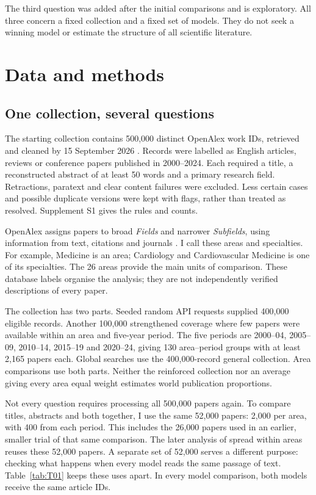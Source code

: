 \documentclass[12pt]{article}
\begin{document}
The third question was added after the initial comparisons and is exploratory. All three concern a fixed collection and a fixed set of models. They do not seek a winning model or estimate the structure of all scientific literature.

\clearpage
\section{Data and methods}
\subsection{One collection, several questions}
The starting collection contains 500,000 distinct OpenAlex work IDs, retrieved and cleaned by 15 September 2026 \citep{priem2022openalex}. Records were labelled as English articles, reviews or conference papers published in 2000--2024. Each required a title, a reconstructed abstract of at least 50 words and a primary research field. Retractions, paratext and clear content failures were excluded. Less certain cases and possible duplicate versions were kept with flags, rather than treated as resolved. Supplement S1 gives the rules and counts.

OpenAlex assigns papers to broad \emph{Fields} and narrower \emph{Subfields}, using information from text, citations and journals \citep{openalex2026topics}. I call these areas and specialties. For example, Medicine is an area; Cardiology and Cardiovascular Medicine is one of its specialties. The 26 areas provide the main units of comparison. These database labels organise the analysis; they are not independently verified descriptions of every paper.

The collection has two parts. Seeded random API requests supplied 400,000 eligible records. Another 100,000 strengthened coverage where few papers were available within an area and five-year period. The five periods are 2000--04, 2005--09, 2010--14, 2015--19 and 2020--24, giving 130 area--period groups with at least 2,165 papers each. Global searches use the 400,000-record general collection. Area comparisons use both parts. Neither the reinforced collection nor an average giving every area equal weight estimates world publication proportions.

Not every question requires processing all 500,000 papers again. To compare titles, abstracts and both together, I use the same 52,000 papers: 2,000 per area, with 400 from each period. This includes the 26,000 papers used in an earlier, smaller trial of that same comparison. The later analysis of spread within areas reuses these 52,000 papers. A separate set of 52,000 serves a different purpose: checking what happens when every model reads the same passage of text. Table~\ref{tab:T01} keeps these uses apart. In every model comparison, both models receive the same article IDs.

\end{document}
